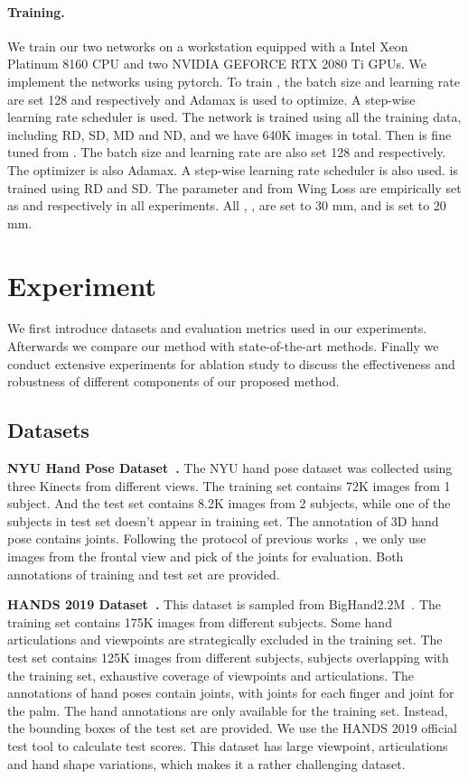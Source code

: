 \documentclass{article}
\begin{document}
\paragraph{Training.}
We train our two networks on a workstation equipped with a Intel Xeon Platinum 8160 CPU and two NVIDIA GEFORCE RTX 2080 Ti GPUs. We implement the networks using pytorch. To train , the batch size and learning rate are set 128 and  respectively and Adamax is used to optimize. 
A step-wise learning rate scheduler is used. The network is trained using all the training data, including RD, SD, MD and ND, and we have 640K images in total.
Then  is fine tuned from . The batch size and learning rate are also set 128 and  respectively. The optimizer is also Adamax. A step-wise learning rate scheduler is also used.
 is trained using RD and SD.
The parameter  and  from Wing Loss are empirically set as  and  respectively in all experiments.
All , ,  are set to 30 mm, and  is set to 20 mm. 
 
\section{Experiment}
We first introduce datasets and evaluation metrics used in our experiments. Afterwards we compare our method with state-of-the-art methods. Finally we conduct extensive experiments for ablation study to discuss the effectiveness and robustness of different components of our proposed method.

\subsection{Datasets}\label{sec:datasets}

\par{\textbf{NYU Hand Pose Dataset~\cite{tompson2014real}.}}
The NYU hand pose dataset was collected using three Kinects from different views. The training set contains 72K images from 1 subject. And the test set contains 8.2K images from 2 subjects, while one of the subjects in test set doesn't appear in training set.
The annotation of 3D hand pose contains  joints. Following the protocol of previous works~\cite{chen2019pose,guo2017region,moon2018v2v}, we only use images from the frontal view and pick  of the  joints for evaluation. Both annotations of training and test set are provided.

\par{\textbf{HANDS 2019 Dataset~\cite{hands2019}.}}
This dataset is sampled from BigHand2.2M~\cite{yuan2017bighand2}. The training set contains 175K images from  different subjects. Some hand articulations and viewpoints are strategically excluded in the training set.
The test set contains 125K images from  different subjects,  subjects overlapping with the training set, exhaustive coverage of viewpoints and articulations. The annotations of hand poses contain  joints, with  joints for each finger and  joint for the palm. The hand annotations are only available for the training set. Instead, the bounding boxes of the test set are provided. We use the HANDS 2019 official test tool to calculate test scores.
This dataset has large viewpoint, articulations and hand shape variations, which makes it a rather challenging dataset. 
\end{document}
